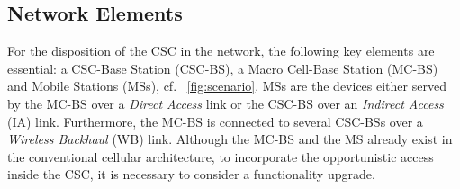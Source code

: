 \documentclass[draftcls, onecolumn, 11pt]{IEEEtran}
\begin{document}
\subsection*{Network Elements}
For the disposition of the CSC in the network, the following key elements are essential: a CSC-Base Station (CSC-BS), a Macro Cell-Base Station (MC-BS) and Mobile Stations (MSs), cf. \figurename~\ref{fig:scenario}. MSs are the devices either served by the MC-BS over a \textit{Direct Access} link or the CSC-BS over an \textit{Indirect Access} (IA) link. Furthermore, the MC-BS is connected to several CSC-BSs over a \textit{Wireless Backhaul} (WB) link. Although the MC-BS and the MS already exist in the conventional cellular architecture, to incorporate the opportunistic access inside the CSC, it is necessary to consider a functionality upgrade.
\end{document}
